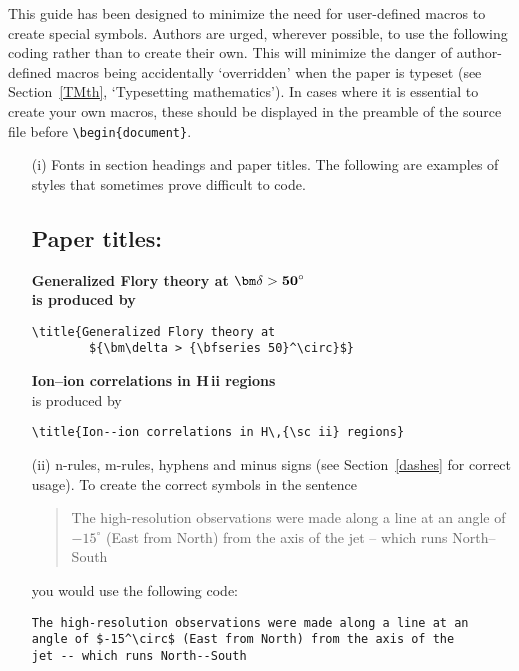 \documentclass{gCMB2e}
\begin{document}
This guide has been designed to minimize the need for user-defined macros to  create special symbols. Authors
are urged, wherever possible, to use the following coding rather than to create their own. This will minimize
the danger of author-defined macros being accidentally `overridden' when the paper is typeset (see
Section~\ref{TMth}, `Typesetting mathematics'). In cases where it is essential to create your own macros,
these should be displayed in the preamble of the source file before \verb"\begin{document}".
%
\begin{enumerate}
\item[(i)] Fonts in section headings and paper titles. The following are  examples
of styles that sometimes prove difficult to code.


\subsection*{Paper titles:}

\bf{\noindent Generalized Flory theory at ${\bm\delta >
{\bf
   50}^\circ}$}\\

    \noindent\normalfont is produced by
\begin{verbatim}
\title{Generalized Flory theory at
        ${\bm\delta > {\bfseries 50}^\circ}$}
\end{verbatim}
\bigskip

{\bf{\noindent Ion--ion correlations in H\,{\sc ii} regions}}\\

\noindent\normalfont is produced by
%
\begin{verbatim}
\title{Ion--ion correlations in H\,{\sc ii} regions}
\end{verbatim}



\item[(ii)] n-rules, m-rules, hyphens and minus signs (see Section~\ref{dashes} for
correct usage). To create the correct symbols in the sentence
%
\begin{quote}
The high-resolution observations were made along a line at an
angle of $-15^\circ$ (East from North) from the axis of the
jet -- which runs North--South
\end{quote}
you would use the following code:
%
\begin{verbatim}
The high-resolution observations were made along a line at an
angle of $-15^\circ$ (East from North) from the axis of the
jet -- which runs North--South
\end{verbatim}


\end{enumerate}
\end{document}

